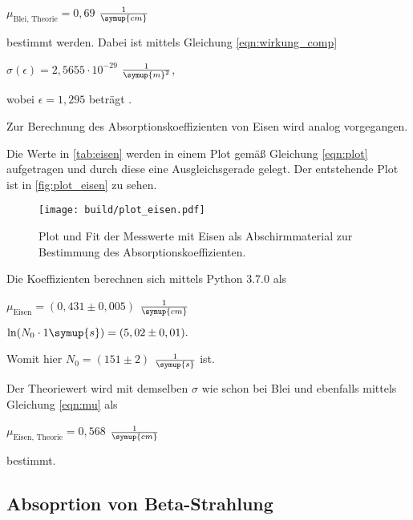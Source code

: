 \begin{center}
    $\mu_\text{Blei, Theorie} = 0,69$ $\frac{1}{\symup{cm}}$
\end{center}

bestimmt werden.
Dabei ist mittels Gleichung \eqref{eqn:wirkung_comp}

\begin{center}
    $\sigma (\epsilon ) = 2,5655 \cdot 10^{-29}$ $\frac{1}{\symup{m}^2}$,
\end{center}

wobei $\epsilon = 1,295$ beträgt \cite{V704}.

Zur Berechnung des Absorptionskoeffizienten von Eisen wird analog vorgegangen.



Die Werte in \autoref{tab:eisen} werden in einem Plot gemäß Gleichung \eqref{eqn:plot} aufgetragen und durch diese eine Ausgleichsgerade gelegt.
Der entstehende Plot ist in \autoref{fig:plot_eisen} zu sehen.

\begin{figure}
    \centering
    \texttt{[image: build/plot\_eisen.pdf]}
    \caption{Plot und Fit der Messwerte mit Eisen als Abschirmmaterial zur Bestimmung des Absorptionskoeffizienten.}
    \label{fig:plot_eisen}
\end{figure}

Die Koeffizienten berechnen sich mittels Python 3.7.0 als

\begin{center}
    $\mu_\text{Eisen} = (0,431 \pm 0,005)$ $\frac{1}{\symup{cm}}$

    $\ln ( N_ 0 \cdot 1 \symup{s}) = (5,02  \pm 0,01).$
\end{center}

Womit hier $N_0 = (151 \pm 2)$ $\frac{1}{\symup{s}}$ ist.

Der Theoriewert wird mit demselben $\sigma$ wie schon bei Blei und ebenfalls mittels Gleichung \eqref{eqn:mu} als

\begin{center}
    $\mu_\text{Eisen, Theorie} = 0,568$ $\frac{1}{\symup{cm}}$
\end{center}

bestimmt.



\subsection{Absoprtion von Beta-Strahlung}

